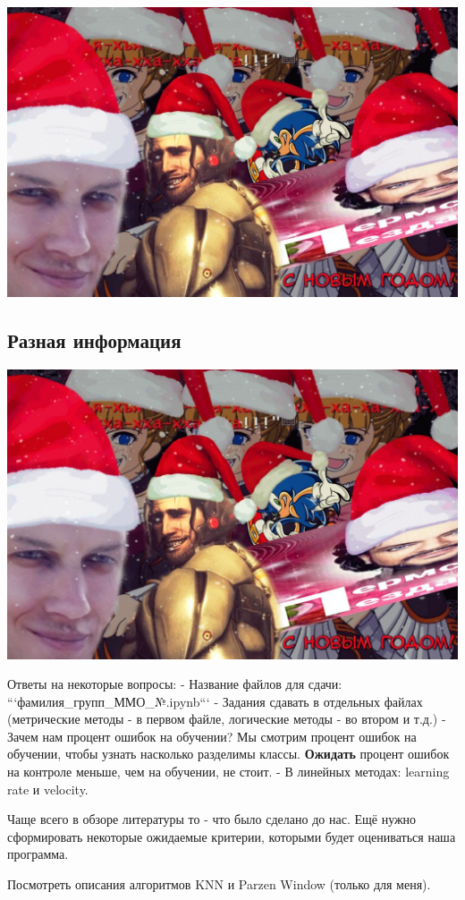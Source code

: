 \includegraphics[scale=0.3]{figures/samplefigure.jpg}

\subsection{Разная информация}

\includegraphics[scale=0.3]{figures/samplefigure.jpg}

Ответы на некоторые вопросы:
- Название файлов для сдачи: ```фамилия\_групп\_ММО\_№.ipynb```
- Задания сдавать в отдельных файлах (метрические методы - в первом файле,
логические методы - во втором и т.д.)
- Зачем нам процент ошибок на обучении?
Мы смотрим процент ошибок на обучении, чтобы узнать насколько разделимы
классы.
\textbf{Ожидать} процент ошибок на контроле меньше, чем на обучении, не стоит.
- В линейных методах: learning rate и velocity.

Чаще всего в обзоре литературы то - что было сделано до нас.
Ещё нужно сформировать некоторые ожидаемые критерии, которыми
будет оцениваться наша программа.

Посмотреть описания алгоритмов KNN и Parzen Window (только для меня).